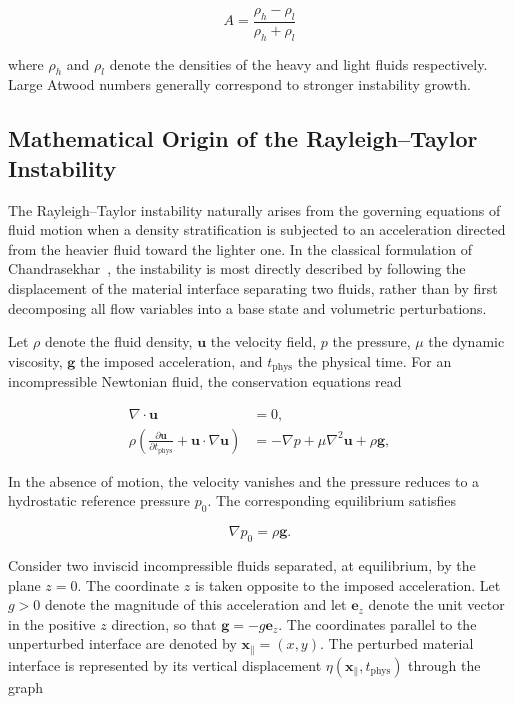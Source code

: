 \begin{equation}
    A = \frac{\rho_h - \rho_l}{\rho_h + \rho_l}
\end{equation}

where $\rho_h$ and $\rho_l$ denote the densities of the heavy and light fluids respectively. Large Atwood numbers generally correspond to stronger instability growth.


\subsection{Mathematical Origin of the Rayleigh--Taylor Instability}

The Rayleigh--Taylor instability naturally arises from the governing equations of fluid motion when a density stratification is subjected to an acceleration directed from the heavier fluid toward the lighter one. In the classical formulation of Chandrasekhar~\cite{chandrasekhar1981hydrodynamic}, the instability is most directly described by following the displacement of the material interface separating two fluids, rather than by first decomposing all flow variables into a base state and volumetric perturbations.

Let $\rho$ denote the fluid density, $\mathbf{u}$ the velocity field, $p$ the pressure, $\mu$ the dynamic viscosity, $\mathbf{g}$ the imposed acceleration, and $t_{\mathrm{phys}}$ the physical time. For an incompressible Newtonian fluid, the conservation equations read

\begin{align}
\nabla\cdot\mathbf{u} &= 0,\\
\rho\left(
\frac{\partial\mathbf{u}}{\partial t_{\mathrm{phys}}}
+\mathbf{u}\cdot\nabla\mathbf{u}
\right)
&=
-\nabla p
+\mu\nabla^2\mathbf{u}
+\rho\mathbf{g},
\end{align}

In the absence of motion, the velocity vanishes and the pressure reduces to a hydrostatic reference pressure $p_0$. The corresponding equilibrium satisfies

\begin{equation}
\nabla p_0=\rho\mathbf{g}.
\end{equation}

Consider two inviscid incompressible fluids separated, at equilibrium, by the plane $z=0$. The coordinate $z$ is taken opposite to the imposed acceleration. Let $g>0$ denote the magnitude of this acceleration and let $\mathbf{e}_z$ denote the unit vector in the positive $z$ direction, so that $\mathbf{g}=-g\mathbf{e}_z$. The coordinates parallel to the unperturbed interface are denoted by $\mathbf{x}_{\parallel}=(x,y)$. The perturbed material interface is represented by its vertical displacement $\eta(\mathbf{x}_{\parallel},t_{\mathrm{phys}})$ through the graph

